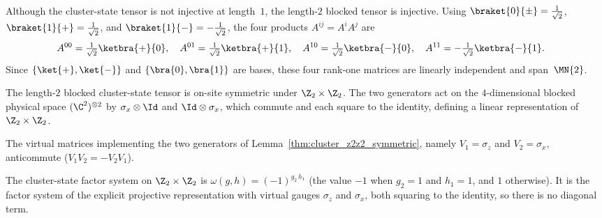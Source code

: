 \begin{remark}\label{rem:cluster_injective_blocked}
    Although the cluster-state tensor is not injective at length~$1$,
    the length-$2$ blocked tensor is injective. Using
    $\braket{0}{\pm} = \tfrac{1}{\sqrt{2}}$,
    $\braket{1}{+} = \tfrac{1}{\sqrt{2}}$, and
    $\braket{1}{-} = -\tfrac{1}{\sqrt{2}}$, the
    four products $A^{ij} = A^i A^j$ are
    \begin{align}
        A^{00} & = \tfrac{1}{\sqrt{2}}\ketbra{+}{0},\quad
        A^{01} = \tfrac{1}{\sqrt{2}}\ketbra{+}{1},\quad
        A^{10} = \tfrac{1}{\sqrt{2}}\ketbra{-}{0},\quad
        A^{11} = -\tfrac{1}{\sqrt{2}}\ketbra{-}{1}.
        \label{eq:ex_cluster_blocked_products}
    \end{align}
    Since $\{\ket{+},\ket{-}\}$ and $\{\bra{0},\bra{1}\}$ are bases,
    these four rank-one matrices are linearly independent and
    span~$\MN{2}$.
\end{remark}

\begin{lemma}\label{thm:cluster_z2z2_symmetric}
    \leanok
    The length-$2$ blocked cluster-state tensor is on-site symmetric
    under $\Z_2 \times \Z_2$. The two generators act on the
    $4$-dimensional blocked physical space $(\C^2)^{\otimes 2}$ by
    $\sigma_x \otimes \Id$ and $\Id \otimes \sigma_x$,
    which commute and each square to the identity, defining a linear
    representation of $\Z_2 \times \Z_2$.
\end{lemma}

\begin{lemma}\label{thm:cluster_gauge_anticomm}
    \leanok
    The virtual matrices implementing the two generators of
    Lemma~\ref{thm:cluster_z2z2_symmetric}, namely $V_1 = \sigma_z$ and
    $V_2 = \sigma_x$, anticommute ($V_1 V_2 = -V_2 V_1$).
\end{lemma}

\begin{definition}\label{def:cluster_omega}
    \leanok
    The cluster-state factor system on $\Z_2 \times \Z_2$ is
    $\omega(g,h) = (-1)^{g_2\,h_1}$ (the value $-1$ when $g_2 = 1$ and
    $h_1 = 1$, and $1$ otherwise). It is the factor system of the explicit
    projective representation with virtual gauges $\sigma_z$ and $\sigma_x$,
    both squaring to the identity, so there is no diagonal term.
\end{definition}


